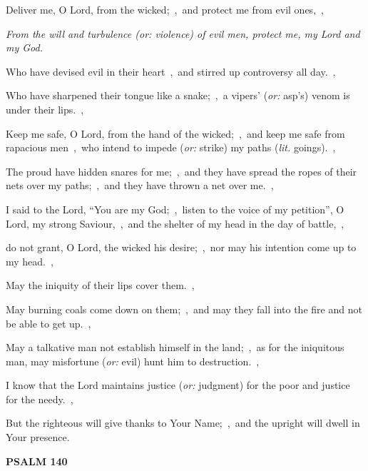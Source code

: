 \documentclass[12pt,twoside,a5paper]{article}
\newcommand{\psalm}[1]{\textbf{PSALM {#1}}\nopagebreak}
\newcommand{\qanona}[1]{{\liturgicalhint{Qanona.} \emph{#1}}}
\newcommand{\translationoption}[1]{\emph{or:} #1}
\newcommand{\translationliteral}[1]{\emph{lit.} #1}
\begin{document}
\begin{normalparskip}
  Deliver me, O Lord, from the wicked;~\sep\ and protect me from evil ones,~\sep

  \qanona{From the will and turbulence (\translationoption{violence}) of evil men, protect me, my Lord and my God.}

  Who have devised evil in their heart~\sep\ and stirred up controversy all day.~\sep

  Who have sharpened their tongue like a snake;~\sep\ a vipers' (\translationoption{asp's}) venom is under their lips.~\sep

  Keep me safe, O Lord, from the hand of the wicked;~\sep\ and keep me safe from rapacious men~\sep\ who intend to impede (\translationoption{strike}) my paths (\translationliteral{goings}).~\sep

  The proud have hidden snares for me;~\sep\ and they have spread the ropes of their nets over my paths;~\sep\ and they have thrown a net over me.~\sep

  I said to the Lord, ``You are my God;~\sep\ listen to the voice of my petition'', O Lord, my strong Saviour,~\sep\ and the shelter of my head in the day of battle,~\sep

  do not grant, O Lord, the wicked his desire;~\sep\ nor may his intention come up to my head.~\sep

  May the iniquity of their lips cover them.~\sep

  May burning coals come down on them;~\sep\ and may they fall into the fire and not be able to get up.~\sep

  May a talkative man not establish himself in the land;~\sep\ as for the iniquitous man, may misfortune (\translationoption{evil}) hunt him to destruction.~\sep

  I know that the Lord maintains justice (\translationoption{judgment}) for the poor and justice for the needy.~\sep

  But the righteous will give thanks to Your Name;~\sep\ and the upright will dwell in Your presence.
\end{normalparskip}

\psalm{140}
\end{document}
